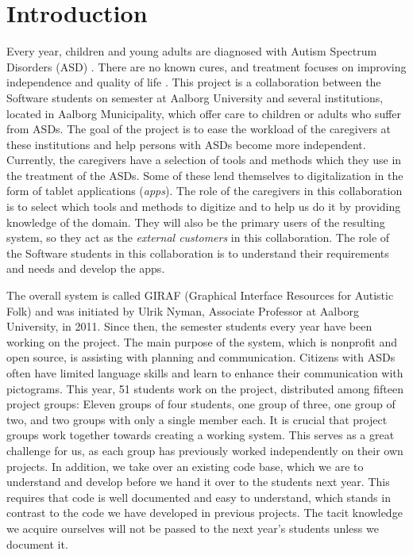 \chapter{Introduction}
Every year, children and young adults are diagnosed with Autism Spectrum Disorders (ASD) \cite{autism_diagnosis_adults,autism_diagnosis_children}. There are no known cures, and treatment focuses on improving independence and quality of life \cite{Myers01112007}. This project is a collaboration between the Software students on  semester at Aalborg University and several institutions, located in Aalborg Municipality, which offer care to children or adults who suffer from ASDs. The goal of the project is to ease the workload of the caregivers at these institutions and help persons with ASDs become more independent. Currently, the caregivers have a selection of tools and methods which they use in the treatment of the ASDs. Some of these lend themselves to digitalization in the form of tablet applications (\emph{apps}). The role of the caregivers in this collaboration is to select which tools and methods to digitize and to help us do it by providing knowledge of the domain. They will also be the primary users of the resulting system, so they act as the \emph{external customers} in this collaboration. The role of the Software students in this collaboration is to understand their requirements and needs and develop the apps.

The overall system is called GIRAF (Graphical Interface Resources for Autistic Folk) and was initiated by Ulrik Nyman, Associate Professor at Aalborg University, in 2011. Since then, the  semester students every year have been working on the project. The main purpose of the system, which is nonprofit and open source, is assisting with planning and communication. Citizens with ASDs often have limited language skills and learn to enhance their communication with pictograms. This year, 51 students work on the project, distributed among fifteen project groups: Eleven groups of four students, one group of three, one group of two, and two groups with only a single member each. It is crucial that project groups work together towards creating a working system. This serves as a great challenge for us, as each group has previously worked independently on their own projects. In addition, we take over an existing code base, which we are to understand and develop before we hand it over to the students next year. This requires that code is well documented and easy to understand, which stands in contrast to the code we have developed in previous projects. The tacit knowledge we acquire ourselves will not be passed to the next year's students unless we document it.

